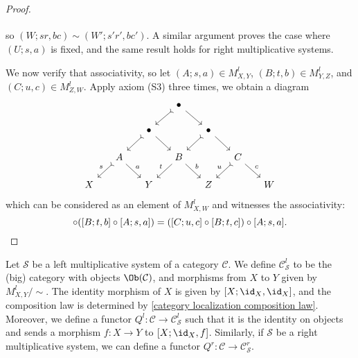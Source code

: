 \begin{proof}
\[\begin{tikzcd}[row sep=15mm, column sep=15mm]
\end{tikzcd}\]
so $(W;sr,bc)\sim(W';s'r',bc')$. A similar argument proves the case where $(U;s,a)$ is fixed, and the same result holds for right multiplicative systems.\par
We now verify that associativity, so let $(A;s,a)\in M_{X,Y}^l$, $(B;t,b)\in M_{Y,Z}^l$, and $(C;u,c)\in M_{Z,W}^l$. Apply axiom (S3) three times, we obtain a diagram
\[\begin{tikzcd}[row sep=5mm, column sep=5mm]
&&&\bullet\ar[rd]\ar[ld,tail]&&&\\
&&\bullet\ar[ld,tail]\ar[rd]&&\bullet\ar[rd]\ar[ld,tail]\\
&A\ar[ld,swap,tail,"s"]\ar[rd,"a"]&&B\ar[rd,"b"]\ar[ld,swap,"t"]&&C\ar[rd,"c"]\ar[ld,swap,"u",tail]&\\
X&&Y&&Z&&W
\end{tikzcd}\]
which can be considered as an element of $M_{X,W}^l$ and witnesses the associativity:
\begin{equation*}
[C;u,c]\circ([B;t,b]\circ[A;s,a])=([C;u,c]\circ[B;t,c])\circ[A;s,a].\qedhere
\end{equation*}
\end{proof}

\begin{definition}
Let $\mathcal{S}$ be a left multiplicative system of a category $\mathcal{C}$. We define $\mathcal{C}_\mathcal{S}^l$ to be the (big) category with objects $\Ob(\mathcal{C})$, and morphisms from $X$ to $Y$ given by $M_{X,Y}^l/\sim$. The identity morphism of $X$ is given by $[X;\id_X,\id_X]$, and the composition law is determined by \cref{category localization composition law}. Moreover, we define a functor $Q^l:\mathcal{C}\to\mathcal{C}_\mathcal{S}^l$ such that it is the identity on objects and sends a morphism $f:X\to Y$ to $[X;\id_X,f]$. Similarly, if $\mathcal{S}$ be a right multiplicative system, we can define a functor $Q^r:\mathcal{C}\to\mathcal{C}_\mathcal{S}^r$.
\end{definition}

